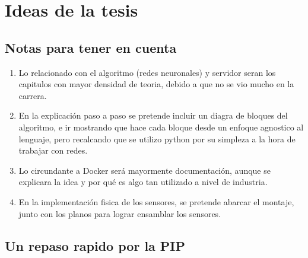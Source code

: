 \chapter{Ideas de la tesis}

\section{Notas para tener en cuenta}

\begin{enumerate}
    \item Lo relacionado con el algoritmo (redes neuronales) y servidor seran los capitulos con mayor densidad de teoria, debido a que no se vio mucho en la carrera.
    \item En la explicación paso a paso se pretende incluir un diagra de bloques del algoritmo, e ir mostrando que hace cada bloque desde un enfoque agnostico al lenguaje, pero recalcando que se utilizo python por su simpleza a la hora de trabajar con redes.
    \item Lo circundante a Docker será mayormente documentación, aunque se explicara la idea y por qué es algo tan utilizado a nivel de industria.
    \item En la implementación fisica de los sensores, se pretende abarcar el montaje, junto con los planos para lograr ensamblar los sensores.
\end{enumerate}

\section{Un repaso rapido por la PIP}










